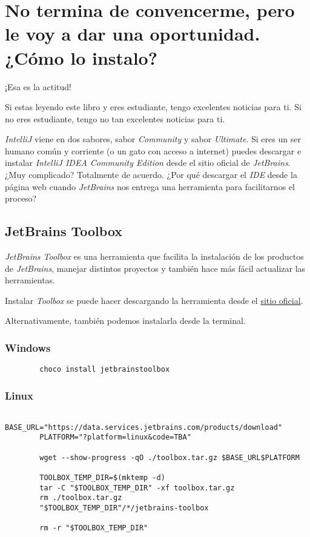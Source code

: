 \section{No termina de convencerme, pero le voy a dar una oportunidad. ¿Cómo lo instalo?}
  ¡Esa es la actitud!

  Si estas leyendo este libro y eres estudiante, tengo excelentes noticias para ti.
  Si no eres estudiante, tengo no tan excelentes noticias para ti.

  \textit{IntelliJ} viene en dos sabores, sabor \textit{Community} y sabor \textit{Ultimate}.
  Si eres un ser humano común y corriente (o un gato con acceso a internet) puedes descargar e 
  instalar \textit{IntelliJ IDEA Community Edition}\index{} desde el sitio oficial de \textit{JetBrains}.
  ¿Muy complicado?
  Totalmente de acuerdo.
  ¿Por qué descargar el \textit{IDE} desde la página web cuando \textit{JetBrains} nos entrega una
  herramienta para facilitarnos el proceso?
  
  \subsection{JetBrains Toolbox}
    \textit{JetBrains Toolbox} es una herramienta que facilita la instalación de los productos de
    \textit{JetBrains}, manejar distintos proyectos y también hace más fácil actualizar las
    herramientas.

    Instalar \textit{Toolbox} se puede hacer descargando la herramienta desde el 
    \href{https://www.jetbrains.com/toolbox-app/}{sitio oficial}.

    Alternativamente, también podemos instalarla desde la terminal.

    \subsubsection*{Windows}
      \begin{verbatim}
        choco install jetbrainstoolbox
      \end{verbatim}
    
    \subsubsection*{Linux}
      \begin{verbatim}
        BASE_URL="https://data.services.jetbrains.com/products/download"
        PLATFORM="?platform=linux&code=TBA"

        wget --show-progress -qO ./toolbox.tar.gz $BASE_URL$PLATFORM
        
        TOOLBOX_TEMP_DIR=$(mktemp -d)
        tar -C "$TOOLBOX_TEMP_DIR" -xf toolbox.tar.gz
        rm ./toolbox.tar.gz
        "$TOOLBOX_TEMP_DIR"/*/jetbrains-toolbox

        rm -r "$TOOLBOX_TEMP_DIR"
      \end{verbatim}

